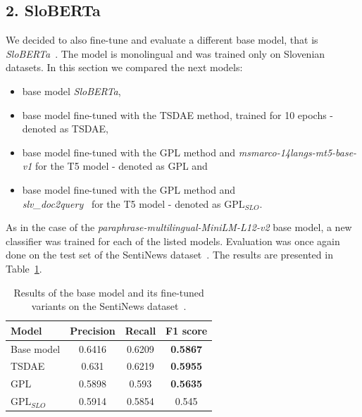 \documentclass[fleqn,moreauthors,10pt]{ds_report}
\begin{document}

\subsection*{\large{2. SloBERTa}}
We decided to also fine-tune and evaluate a different base model, that is {\it SloBERTa}~\cite{sloberta}. The model is monolingual and was trained only on Slovenian datasets. In this section we compared the next models:
\begin{itemize}
	\item base model {\it SloBERTa},
	\item base model fine-tuned with the TSDAE method, trained for 10 epochs - denoted as TSDAE,
	\item base model fine-tuned with the GPL method and {\it msmarco-14langs-mt5-base-v1} \cite{msmarco14langs} for the T5 model - denoted as GPL and
	\item base model fine-tuned with the GPL method and \\{\it slv\_doc2query}~\cite{boshko} for the T5 model - denoted as $\text{GPL}_{SLO}$.
\end{itemize}

As in the case of the {\it paraphrase-multilingual-MiniLM-L12-v2} base model, a new classifier was trained for each of the listed models. Evaluation was once again done on the test set of the SentiNews dataset~\cite{sentiNews}. The results are presented in Table~\ref{tab4}.

\begin{table}[!h]
	\footnotesize
	\begin{center}
		\begin{tabular}{ |l|c|c|c| }
		\hline
		\rowcolor{Blue}Model & Precision & Recall & F1 score\\
		\hline

		Base model & 0.6416 & 0.6209 & \textbf{0.5867}\\
		\hline
		TSDAE & 0.631 & 0.6219 & \textbf{0.5955}\\
		\hline
		GPL & 0.5898 & 0.593 & \textbf{0.5635}\\
		$\text{GPL}_{SLO}$ & 0.5914 & 0.5854 & 0.545\\

		\hline
		\end{tabular}
	\end{center}
\caption{Results of the base model and its fine-tuned variants on the SentiNews dataset~\cite{sentiNews}.}
\label{tab4}
\end{table}
\end{document}
